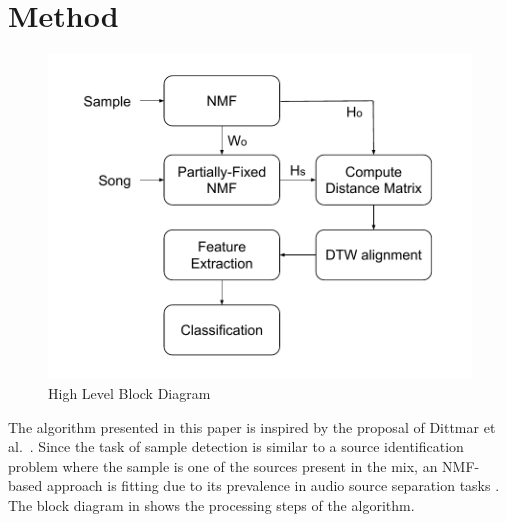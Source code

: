 \documentclass{article}
\begin{document}


\section{Method}
\label{algo}

\begin{figure}[t]
\centering
\includegraphics[width=\linewidth]{block_diagram.pdf}
\caption{High Level Block Diagram}
\label{fig_block}
\end{figure}

The algorithm presented in this paper is inspired by the proposal of Dittmar et al.~\cite{dittmar2012audio}. Since the task of sample detection is similar to a source identification problem where the sample is one of the sources present in the mix, an NMF-based approach is fitting due to its prevalence in audio source separation tasks \cite{schmidt2006nonnegative, ozerov2010multichannel}. The block diagram in  shows the processing steps of the algorithm.
\end{document}

